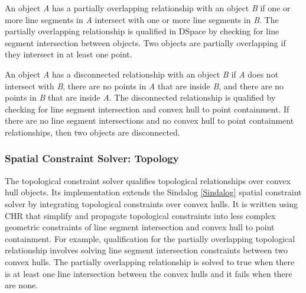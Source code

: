 \documentclass[12pt]{ucthesis}
\begin{document}
An object \emph{A} has a partially overlapping relationship with an object \emph{B} if one or more line segments in \emph{A} intersect with one or more line segments in \emph{B}. The partially overlapping relationship is qualified in DSpace by checking for line segment intersection between objects. Two objects are partially overlapping if they intersect in at least one point.  

An object \emph{A} has a disconnected relationship with an object \emph{B} if \emph{A} does not intersect with \emph{B}, there are no points in \emph{A} that are inside \emph{B}, and there are no points in \emph{B} that are inside \emph{A}. The disconnected relationship is qualified by checking for line segment intersection and convex hull to point containment. If there are no line segment intersections and no convex hull to point containment relationships, then two objects are disconnected.  

\subsubsection{Spatial Constraint Solver: Topology}
The topological constraint solver qualifies topological relationships over convex hull objects. Its implementation extends the Sindalog \ref{Sindalog} spatial constraint solver by integrating topological constraints over convex hulls. It is written using CHR that simplify and propagate topological constraints into less complex geometric constraints of line segment intersection and convex hull to point containment. For example, qualification for the partially overlapping topological relationship involves solving line segment intersection constraints between two convex hulls. The partially overlapping relationship is solved to true when there is at least one line intersection between the convex hulls and it fails when there are none. 


\end{document}
